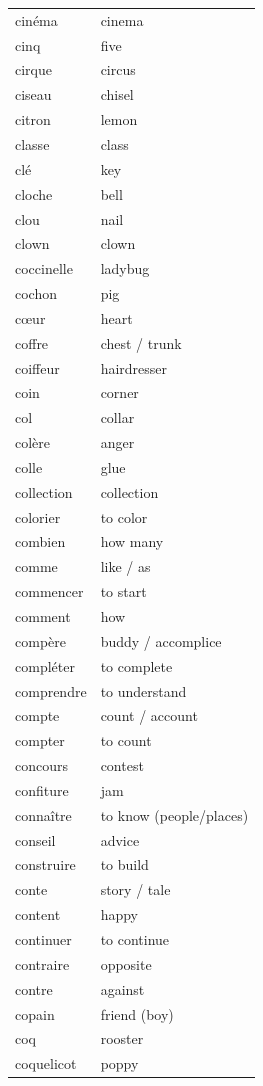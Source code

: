 \documentclass[12pt,a4paper]{article}
\begin{document}
\begin{longtable}{p{4cm} p{6cm}}
cinéma & cinema \\
cinq & five \\
cirque & circus \\
ciseau & chisel \\
citron & lemon \\
classe & class \\
clé & key \\
cloche & bell \\
clou & nail \\
clown & clown \\
coccinelle & ladybug \\
cochon & pig \\
cœur & heart \\
coffre & chest / trunk \\
coiffeur & hairdresser \\
coin & corner \\
col & collar \\
colère & anger \\
colle & glue \\
collection & collection \\
colorier & to color \\
combien & how many \\
comme & like / as \\
commencer & to start \\
comment & how \\
compère & buddy / accomplice \\
compléter & to complete \\
comprendre & to understand \\
compte & count / account \\
compter & to count \\
concours & contest \\
confiture & jam \\
connaître & to know (people/places) \\
conseil & advice \\
construire & to build \\
conte & story / tale \\
content & happy \\
continuer & to continue \\
contraire & opposite \\
contre & against \\
copain & friend (boy) \\
coq & rooster \\
coquelicot & poppy \\

\end{longtable}
\end{document}
